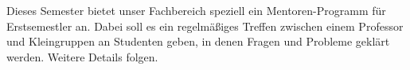\begin{description}
%
%

Dieses Semester bietet unser Fachbereich speziell ein Mentoren-Programm für Erstsemestler an. Dabei soll es ein regelmäßiges Treffen zwischen einem Professor und Kleingruppen an Studenten geben, in denen Fragen und Probleme geklärt werden. Weitere Details folgen.

\end{description}
